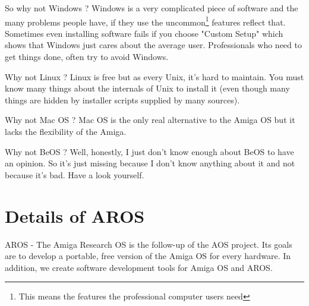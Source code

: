So why not Windows ? Windows is a very complicated piece of software and the many
problems people have, if they use the uncommon\footnote{This means the
features the professional computer users need} features reflect that.
Sometimes even installing software fails if you choose "Custom Setup" which
shows that Windows just cares about the average user. Professionals who
need to get things done, often try to avoid Windows.

Why not Linux ? Linux is free but as every Unix, it's hard to maintain.
You must know many things about the internals of Unix to install it
(even though many things are hidden by installer scripts supplied by many
sources).

Why not Mac OS ? Mac OS is the only real alternative to the Amiga OS but it
lacks the flexibility of the Amiga.

Why not BeOS ? Well, honestly, I just don't know enough about BeOS
to have an opinion. So it's just missing because I don't know anything
about it and not because it's bad. Have a look yourself.

\section{Details of AROS}

AROS - The Amiga Research OS is the follow-up of the AOS project.
Its goals are to develop a portable, free version of the Amiga OS for
every hardware. In addition, we create software development tools for
Amiga OS and AROS.

